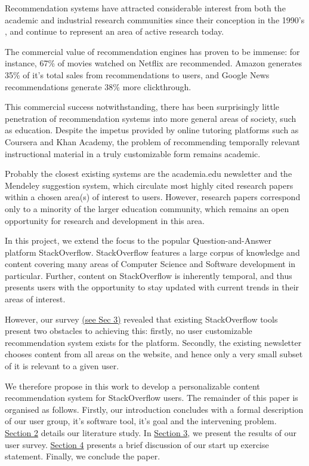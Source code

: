 \documentclass{sig-alternate-05-2015}
\begin{document}
Recommendation systems have attracted considerable interest from both the academic and industrial research communities since their conception in the 1990's \cite{1,2,3}, and continue to represent an area of active research today.

The commercial value of recommendation engines has proven to be immense: for instance, 67\% of movies watched on Netflix\cite{4} are recommended. Amazon generates 35\%\cite{5} of it's total sales from recommendations to users, and Google News recommendations\cite{6} generate 38\% more clickthrough. 

This commercial success notwithstanding, there has been surprisingly little penetration of recommendation systems into more general areas of society, such as education. Despite the impetus provided by online tutoring platforms such as Coursera and Khan Academy, the problem of recommending temporally relevant instructional material in a truly customizable form remains academic\cite{7,8}.

Probably the closest existing systems are the academia.edu\cite{9} newsletter and the Mendeley\cite{10} suggestion system, which circulate most highly cited research papers within a chosen area(s) of interest to users. However, research papers correspond only to a minority of the larger education community, which remains an open opportunity for research and development in this area.

In this project, we extend the focus to the popular Question-and-Answer platform StackOverflow\cite{11}. StackOverflow features a large corpus of knowledge and content covering many areas of Computer Science and Software development in particular. Further, content on StackOverflow is inherently temporal, and thus presents users with the opportunity to stay updated with current trends in their areas of interest.

However, our survey \hyperref[sec:hello]{(see Sec 3)} revealed that existing StackOverflow tools present two obstacles to achieving this: firstly, no user customizable recommendation system exists for the platform. Secondly, the existing newsletter chooses content from all areas on the website, and hence only a very small subset of it is relevant to a given user. 

We therefore propose in this work to develop a personalizable content recommendation system for StackOverflow users. The remainder of this paper is organised as follows. Firstly, our introduction concludes with a formal description of our user group, it's software tool, it's goal and the intervening problem. \hyperref[lit]{Section 2} details our literature study. In \hyperref[sec:hello]{Section 3}, we present the results of our user survey. \hyperref[start]{Section 4} presents a brief discussion of our start up exercise statement. Finally, we conclude the paper.
\end{document}
